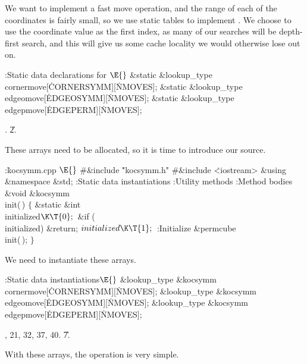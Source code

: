 We want to implement a fast move operation, and the range of each
of the coordinates is fairly small, so we use static tables to implement
.  We choose to use the coordinate value as the first index, as
many of our searches will be depth-first search, and this will give
us some cache locality we would otherwise lose out on.

\Y\B\4:Static data declarations for \X${}\E{}$\6
\&{static} \&{lookup\_type} \\{cornermove}[\.{CORNERSYMM}][\.{NMOVES}];\6
\&{static} \&{lookup\_type} \\{edgeomove}[\.{EDGEOSYMM}][\.{NMOVES}];\6
\&{static} \&{lookup\_type} \\{edgepmove}[\.{EDGEPERM}][\.{NMOVES}];\par
{}.
\U2.\fi

These arrays need to be allocated, so it is time to introduce our
 source.

\Y\B\4:\.{kocsymm.cpp }\X${}\E{}$\6
\8\#\&{include} \.{"kocsymm.h"}\6
\8\#\&{include} \.{<iostream>}\6
\&{using} \&{namespace} \&{std};\7
:Static data instantiations\X\6
:Utility methods\X\6
:Method bodies\X\7
\&{void} \&{kocsymm}\DC\\{init}(\,)\1\1\2\2\6
${}\{{}$\1\6
\&{static} \&{int} \\{initialized}${}\K\T{0};{}$\7
\&{if} (\\{initialized})\1\5
\&{return};\2\6
${}\\{initialized}\K\T{1};{}$\6
:Initialize \X\6
\&{permcube}\DC\\{init}(\,);\6
\4${}\}{}$\2\par
\fi

We need to instantiate these arrays.

\Y\B\4:Static data instantiations\X${}\E{}$\6
\&{lookup\_type} \&{kocsymm}\DC\\{cornermove}[\.{CORNERSYMM}][\.{NMOVES}];\6
\&{lookup\_type} \&{kocsymm}\DC\\{edgeomove}[\.{EDGEOSYMM}][\.{NMOVES}];\6
\&{lookup\_type} \&{kocsymm}\DC\\{edgepmove}[\.{EDGEPERM}][\.{NMOVES}];\par
{}, 21, 32, 37, 40.
\U7.\fi

With these arrays, the  operation is very simple.

